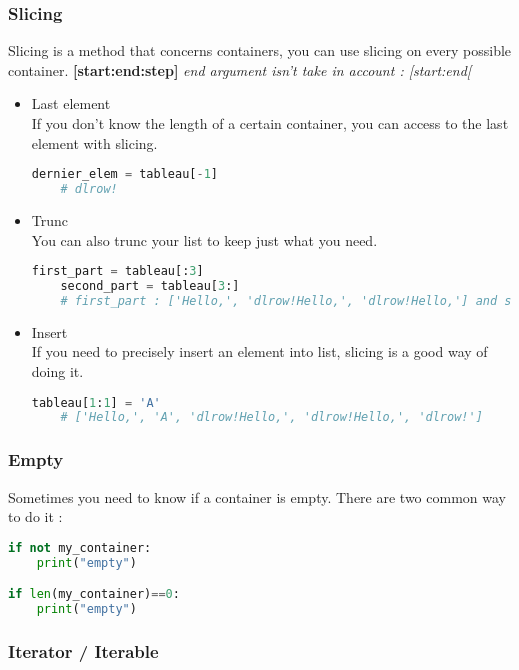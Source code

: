 \documentclass[a4paper, 12pt]{article}
\begin{document}
\subsubsection{Slicing}
Slicing is a method that concerns containers, you can use slicing on every possible container. \textbf{[start:end:step]} \textit{end argument isn't take in account : [start:end[}
\begin{itemize}
    \item Last element \\
    If you don't know the length of a certain container, you can access to the last element with slicing.
    \begin{lstlisting}[language=Python]
    dernier_elem = tableau[-1]
    # dlrow!
    \end{lstlisting}
    
    \item Trunc \\
    You can also trunc your list to keep just what you need.
    \begin{lstlisting}[language=Python]
    first_part = tableau[:3]
    second_part = tableau[3:]
    # first_part : ['Hello,', 'dlrow!Hello,', 'dlrow!Hello,'] and second_part : ['dlrow!']
    \end{lstlisting}
    
    \item Insert \\
    If you need to precisely insert an element into list, slicing is a good way of doing it.
    \begin{lstlisting}[language=Python]
    tableau[1:1] = 'A'
    # ['Hello,', 'A', 'dlrow!Hello,', 'dlrow!Hello,', 'dlrow!']
    \end{lstlisting}
\end{itemize}

\subsubsection{Empty}
Sometimes you need to know if a container is empty. There are two common way to do it :
\begin{lstlisting}[language=Python]
if not my_container:
    print("empty")

if len(my_container)==0:
    print("empty")
\end{lstlisting}

\subsubsection{Iterator / Iterable}
\end{document}
